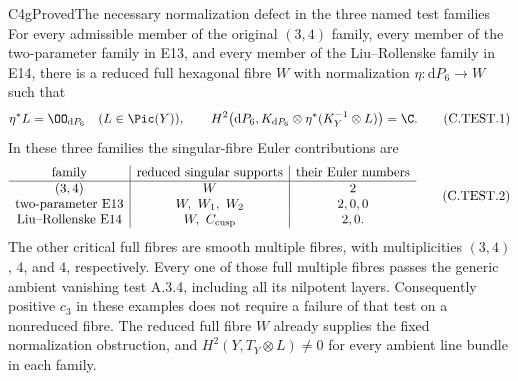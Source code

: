 \begin{statement}{C4g}{Proved}{The necessary normalization defect in the three named test families}
For every admissible member of the original $(3,4)$ family,
every member of the two-parameter family in E13, and every
member of the Liu--Rollenske family in E14, there is a reduced
full hexagonal fibre $W$ with normalization
$\eta:\mathrm dP_6\to W$ such that
\[
 \eta^*L=\OO_{\mathrm dP_6}\quad(L\in\Pic(Y)),\qquad
 H^2\bigl(\mathrm dP_6,K_{\mathrm dP_6}\otimes
                    \eta^*(K_Y^{-1}\otimes L)\bigr)=\C.
 \tag{C.TEST.1}
\]
In these three families the singular-fibre Euler contributions are
\[
\begin{array}{c|c|c}
\text{family}&\text{reduced singular supports}&
                 \text{their Euler numbers}\\ \hline
(3,4)&W&2\\
\text{two-parameter E13}&W,\ W_1,\ W_2&2,0,0\\
\text{Liu--Rollenske E14}&W,\ C_{\rm cusp}&2,0 .
\end{array}
\tag{C.TEST.2}
\]
The other critical full fibres are smooth multiple fibres,
with multiplicities $(3,4)$, $4$, and $4$, respectively.
Every one of those full multiple fibres passes the generic
ambient vanishing test A.3.4, including all its nilpotent
layers. Consequently positive $c_3$ in these examples does
not require a failure of that test on a nonreduced fibre.
The reduced full fibre $W$ already supplies the fixed
normalization obstruction, and $H^2(Y,T_Y\otimes L)\ne0$
for every ambient line bundle in each family.
\end{statement}
